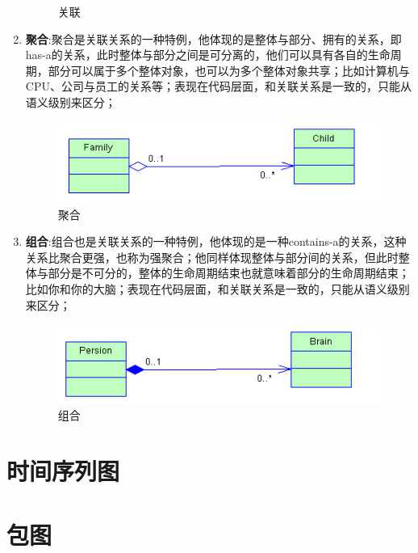 \documentclass[UTF8,a4paper,12pt]{ctexbook}
\begin{document}
\begin{enumerate}
\begin{figure}[h]
				\caption{关联}
			\end{figure}
		\item \textbf{聚合}:聚合是关联关系的一种特例，他体现的是整体与部分、拥有的关系，即has-a的关系，此时整体与部分之间是可分离的，他们可以具有各自的生命周期，部分可以属于多个整体对象，也可以为多个整体对象共享；比如计算机与CPU、公司与员工的关系等；表现在代码层面，和关联关系是一致的，只能从语义级别来区分； 
			\begin{figure}[h]
				\centering
				\includegraphics[scale = 0.7]{Aggregation.jpg}
				\caption{聚合}
			\end{figure}
		\item \textbf{组合}:组合也是关联关系的一种特例，他体现的是一种contains-a的关系，这种关系比聚合更强，也称为强聚合；他同样体现整体与部分间的关系，但此时整体与部分是不可分的，整体的生命周期结束也就意味着部分的生命周期结束；比如你和你的大脑；表现在代码层面，和关联关系是一致的，只能从语义级别来区分； 
			\begin{figure}[h]
				\centering
				\includegraphics[scale = 0.7]{Composition.jpg}
				\caption{组合}
			\end{figure}
	\end{enumerate}

\section{时间序列图}


\section{包图}
\end{document}

